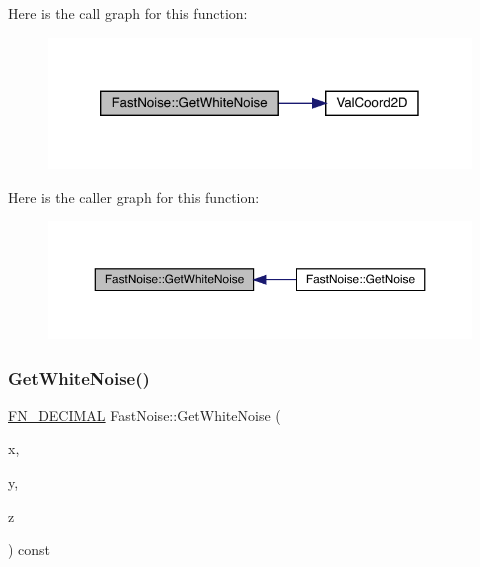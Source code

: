 Here is the call graph for this function\+:
\nopagebreak
\begin{figure}[H]
\begin{center}
\leavevmode
\includegraphics[width=320pt]{class_fast_noise_aaf5a3c39b9e95d064690711852fb7fbf_cgraph}
\end{center}
\end{figure}
Here is the caller graph for this function\+:
\nopagebreak
\begin{figure}[H]
\begin{center}
\leavevmode
\includegraphics[width=350pt]{class_fast_noise_aaf5a3c39b9e95d064690711852fb7fbf_icgraph}
\end{center}
\end{figure}
\mbox{\label{class_fast_noise_a661febd01ba99e06b9de5fab9bd13fb0}} 
\subsubsection{\texorpdfstring{Get\+White\+Noise()}{GetWhiteNoise()}\hspace{0.1cm}{\footnotesize\ttfamily [2/3]}}
{\footnotesize\ttfamily \mbox{\hyperlink{_fast_noise_8h_a75a9ef6d2541c4921815b885bfd449c3}{F\+N\+\_\+\+D\+E\+C\+I\+M\+AL}} Fast\+Noise\+::\+Get\+White\+Noise (\begin{DoxyParamCaption}\item[{\mbox{\hyperlink{_fast_noise_8h_a75a9ef6d2541c4921815b885bfd449c3}{F\+N\+\_\+\+D\+E\+C\+I\+M\+AL}}}]{x,  }\item[{\mbox{\hyperlink{_fast_noise_8h_a75a9ef6d2541c4921815b885bfd449c3}{F\+N\+\_\+\+D\+E\+C\+I\+M\+AL}}}]{y,  }\item[{\mbox{\hyperlink{_fast_noise_8h_a75a9ef6d2541c4921815b885bfd449c3}{F\+N\+\_\+\+D\+E\+C\+I\+M\+AL}}}]{z }\end{DoxyParamCaption}) const}

